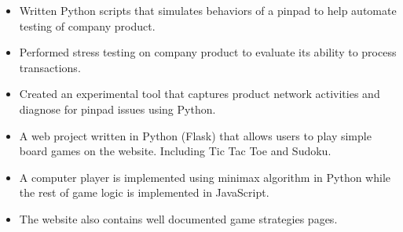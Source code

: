 \documentclass[10pt,a4paper]{altacv}
\begin{document}

\begin{fullwidth}
\makecvheader
\end{fullwidth}


\marginpar{\vspace*{-85pt}\raggedright}


\begin{itemize}
\item Written Python scripts that simulates behaviors of a pinpad to help automate testing of company product.
\item Performed stress testing on company product to evaluate its ability to process transactions.
\item Created an experimental tool that captures product network activities and diagnose for pinpad issues using Python.
\end{itemize}



\begin{itemize}
    \item A web project written in Python (Flask) that allows users to play simple board games on the website. Including Tic Tac Toe and Sudoku.
    \item A computer player is implemented using minimax algorithm in Python while the rest of game logic is implemented in JavaScript.
    \item The website also contains well documented game strategies pages.
\end{itemize}
\end{document}
